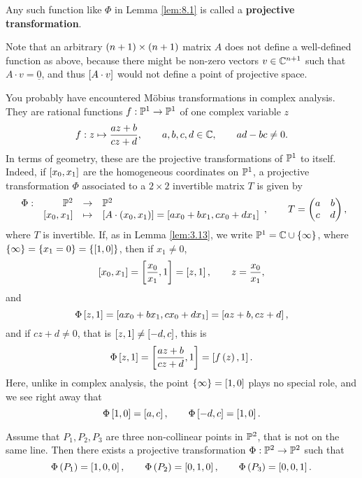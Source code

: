 \begin{definition}
Any such function like $ \Phi $ in Lemma \ref{lem:8.1} is called a \textbf{projective transformation}.
\end{definition}

\begin{remark}
Note that an arbitrary $ \rb{n + 1} \times \rb{n + 1} $ matrix $ A $ does not define a well-defined function as above, because there might be non-zero vectors $ v \in \C^{n + 1} $ such that $ A \cdot v = \underline{0} $, and thus $ \sb{A \cdot v} $ would not define a point of projective space.
\end{remark}

\pagebreak

\begin{example}
\label{eg:8.4}
You probably have encountered M\"obius transformations in complex analysis. They are rational functions $ f : \P^1 \to \P^1 $ of one complex variable $ z $
$$ f : z \mapsto \dfrac{az + b}{cz + d}, \qquad a, b, c, d \in \C, \qquad ad - bc \ne 0. $$
In terms of geometry, these are the projective transformations of $ \P^1 $ to itself. Indeed, if $ \sb{x_0, x_1} $ are the homogeneous coordinates on $ \P^1 $, a projective transformation $ \Phi $ associated to a $ 2 \times 2 $ invertible matrix $ T $ is given by
$$ \function[\Phi]{\P^2}{\P^2}{\sb{x_0, x_1}}{\sb{A \cdot \rb{x_0, x_1}} = \sb{ax_0 + bx_1, cx_0 + dx_1}}, \qquad T = \twobytwo{a}{b}{c}{d}, $$
where $ T $ is invertible. If, as in Lemma \ref{lem:3.13}, we write $ \P^1 = \C \cup \cb{\infty} $, where $ \cb{\infty} = \cb{x_1 = 0} = \cb{\sb{1, 0}} $, then if $ x_1 \ne 0 $,
$$ \sb{x_0, x_1} = \sb{\dfrac{x_0}{x_1}, 1} = \sb{z, 1}, \qquad z = \dfrac{x_0}{x_1}, $$
and
$$ \Phi\sb{z, 1} = \sb{ax_0 + bx_1, cx_0 + dx_1} = \sb{az + b, cz + d}, $$
and if $ cz + d \ne 0 $, that is $ \sb{z, 1} \ne \sb{-d, c} $, this is
$$ \Phi\sb{z, 1} = \sb{\dfrac{az + b}{cz + d}, 1} = \sb{f\rb{z}, 1}. $$
Here, unlike in complex analysis, the point $ \cb{\infty} = \sb{1, 0} $ plays no special role, and we see right away that
$$ \Phi\sb{1, 0} = \sb{a, c}, \qquad \Phi\sb{-d, c} = \sb{1, 0}. $$
\end{example}

\begin{theorem}
\label{thm:8.5}
Assume that $ P_1, P_2, P_3 $ are three non-collinear points in $ \P^2 $, that is not on the same line. Then there exists a projective transformation $ \Phi : \P^2 \to \P^2 $ such that
$$ \Phi\rb{P_1} = \sb{1, 0, 0}, \qquad \Phi\rb{P_2} = \sb{0, 1, 0}, \qquad \Phi\rb{P_3} = \sb{0, 0, 1}. $$
\end{theorem}

